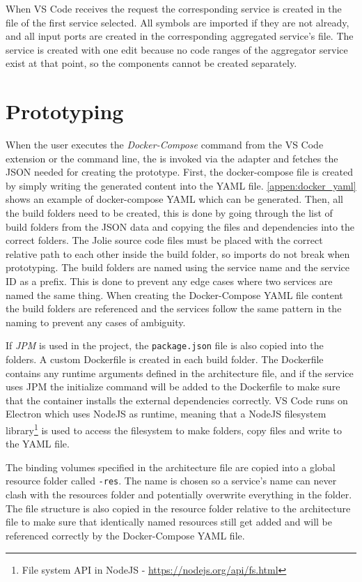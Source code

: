 When VS Code receives the request the corresponding service is created in the file of the first service selected.
All symbols are imported if they are not already, and all input ports are created in the corresponding aggregated service's file.
The service is created with one edit because no code ranges of the aggregator service exist at that point, so the components cannot be created separately.

\section{Prototyping}
When the user executes the \textit{Docker-Compose} command from the VS Code extension or the command line, the
\javatoolname[] is invoked via the adapter and fetches the JSON needed for creating the prototype.
First, the docker-compose file is created by simply writing the generated content into the YAML file.
\cref{appen:docker_yaml} shows an example of docker-compose YAML which can be generated.
Then, all the build folders need to be created, this is done by going through the list of build folders from the JSON data and copying the files and dependencies into the correct folders.
The Jolie source code files must be placed with the correct relative path to each other inside the build folder, so imports do not break when prototyping.
The build folders are named using the service name and the service ID as a prefix. This is done to prevent any edge cases where two services are named the same thing.
When creating the Docker-Compose YAML file content the build folders are referenced and the services follow the same pattern in the naming to prevent any cases of ambiguity.

If \textit{JPM} is used in the project, the \texttt{package.json} file is also copied into the folders.
A custom Dockerfile is created in each build folder. The Dockerfile contains any runtime arguments defined in the architecture file, and if the service uses JPM the initialize command will be added to the Dockerfile to make sure that the container installs the external dependencies correctly.
VS Code runs on Electron which uses NodeJS as runtime, meaning that a NodeJS filesystem library\footnote{File system API in NodeJS - \url{https://nodejs.org/api/fs.html}} is used to access the filesystem to make folders, copy files and write to the YAML file.

The binding volumes specified in the architecture file are copied into a global resource folder called \texttt{-res}. The name is chosen so a service's name can never clash with the resources folder and potentially overwrite everything in the folder.
The file structure is also copied in the resource folder relative to the architecture file to make sure that identically named resources still get added and will be referenced correctly by the Docker-Compose YAML file.


